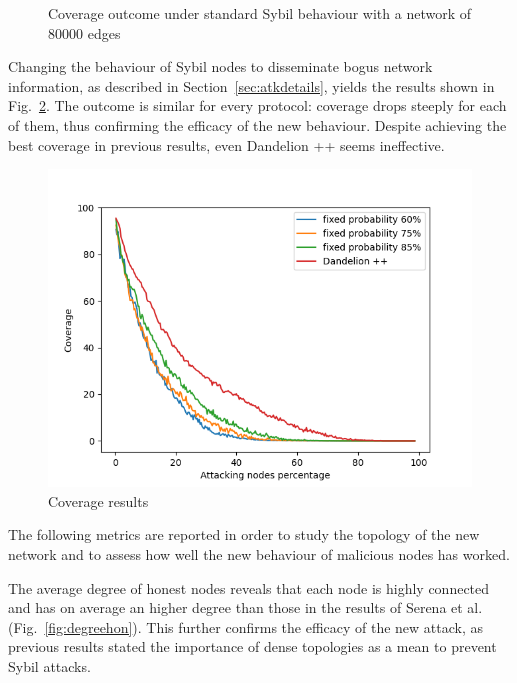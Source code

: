\begin{figure}[ht]
\begin{minipage}[b]{0.5\linewidth}
			\centering 
			\caption{Coverage outcome under standard Sybil behaviour with a network of 80000 edges}
			\label{fig:notatk80}
        \end{minipage}
    \end{figure}

Changing the behaviour of Sybil nodes to disseminate bogus network information, as described in Section~\ref{sec:atkdetails}, yields the results shown in Fig.~\ref{fig:in-cov}. The outcome is similar for every protocol: coverage drops steeply for each of them, thus confirming the efficacy of the new behaviour. Despite achieving the best coverage in previous results, even Dandelion ++ seems ineffective.\par

\begin{figure}[h]
	\includegraphics[width=.8\textwidth]{pict/results/in-cov.png}
	\centering 
	\caption{Coverage results}
	\label{fig:in-cov}
\end{figure}

The following metrics are reported in order to study the topology of the new network and to assess how well the new behaviour of malicious nodes has worked.

The average degree of honest nodes reveals that each node is highly connected and has on average an higher degree than those in the results of Serena et al. (Fig.~\ref{fig:degreehon}). This further confirms the efficacy of the new attack, as previous results stated the importance of dense topologies as a mean to prevent Sybil attacks.\par

